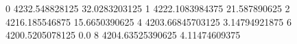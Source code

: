 0 4232.548828125 32.0283203125
1 4222.1083984375 21.587890625
2 4216.185546875 15.6650390625
4 4203.66845703125 3.14794921875
6 4200.5205078125 0.0
8 4204.63525390625 4.11474609375

